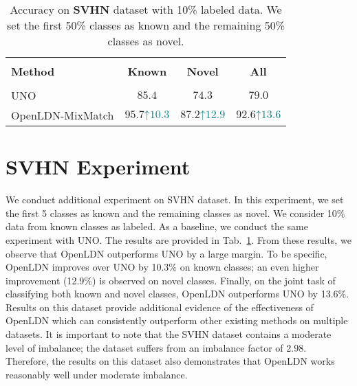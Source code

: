 \documentclass[runningheads]{eccv2022submission}
\begin{document}
\begin{table}[h]
\begin{center}\setlength{\tabcolsep}{2pt}
\small
\begin{tabular}{lccc}
\hline

\hline

\hline\\[-3mm]
\textbf{Method}  & \textbf{Known} & \textbf{Novel} & \textbf{All}\\
 [-3mm]
\\
 \hline

\hline

\hline
UNO\cite{fini2021unified} & $85.4$ & $74.3$ & $79.0$\\
\rowcolor[gray]{.95} {OpenLDN-MixMatch} & $\mathbf{95.7}${\tiny{\textcolor{teal}{$\mathord{\uparrow}10.3$}}} & $\mathbf{87.2}${\tiny{\textcolor{teal}{$\mathord{\uparrow}12.9$}}} & $\mathbf{92.6}${\tiny{\textcolor{teal}{$\mathord{\uparrow}13.6$}}}\\\hline 

\hline

\hline
\end{tabular}
\end{center}
\caption{Accuracy on \textbf{SVHN}  dataset with 10\% labeled data. We set the first 50\% classes as known and the remaining 50\% classes as novel.}
\label{tab:svhn}
\vspace{-10mm}
\end{table}


\section{SVHN Experiment}
\label{sec:svhn}

We conduct additional experiment on SVHN\cite{netzer2011reading} dataset. In this experiment, we set the first 5 classes as known and the remaining classes as novel. We consider 10\% data from known classes as labeled. As a baseline, we conduct the same experiment with UNO\cite{fini2021unified}. The results are provided in Tab.~\ref{tab:svhn}. From these results, we observe that OpenLDN outperforms UNO by a large margin. To be specific, OpenLDN improves over UNO by 10.3\% on known classes; an even higher improvement (12.9\%) is observed on novel classes. Finally, on the joint task of classifying both known and novel classes, OpenLDN outperforms UNO by 13.6\%. Results on this dataset provide additional evidence of the effectiveness of OpenLDN which can consistently outperform other existing methods on multiple datasets. It is important to note that the SVHN dataset contains a moderate level of imbalance; the dataset suffers from an imbalance factor\cite{zhou2020bbn} of 2.98. Therefore, the results on this dataset also demonstrates that OpenLDN works reasonably well under moderate imbalance.        
\end{document}
